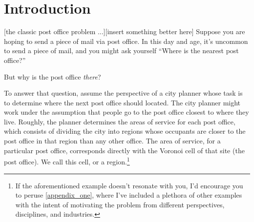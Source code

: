 \documentclass[12pt,twoside]{reedthesis}
\begin{document}
  \chapter*{Introduction}
  [the classic post office problem ...][insert something better here]
  Suppose you are hoping to send a piece of mail via post office. In this day and age, it's uncommon to send a piece of mail, and you might ask yourself ``Where is the nearest post office?'' \par
  But why is the post office \emph{there}? \par
  To answer that question, assume the perspective of a city planner whose task is to determine where the next post office should located. The city planner might work under the assumption that people go to the post office closest to where they live. Roughly, the planner determines the areas of service for each post office, which consists of dividing the city into regions whose occupants are closer to the post office in that region than any other office. The area of service, for a particular post office, corresponds directly with the Voronoi cell of that site (the post office). We call this cell, or a region.\footnote{If the aforementioned example doesn't resonate with you, I'd encourage you to peruse \cref{appendix_one}, where I've included a plethora of other examples with the intent of motivating the problem from different perspectives, disciplines, and industries.}
\end{document}
